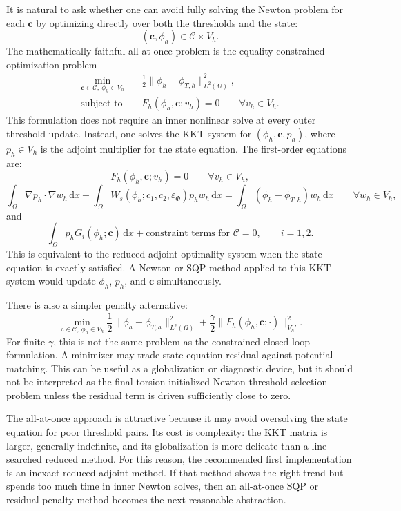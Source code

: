 \documentclass[11pt]{article}
\newcommand{\dd}{\,\mathrm d}
\newcommand{\OmegaD}{\Omega}
\newcommand{\W}{W}
\newcommand{\cvec}{\bm c}
\newcommand{\epsp}{\varepsilon_\Phi}
\begin{document}
It is natural to ask whether one can avoid fully solving the Newton problem
for each \(\cvec\) by optimizing directly over both the thresholds and the
state:
\[
  (\cvec,\phi_h)\in\mathcal C\times V_h.
\]
The mathematically faithful all-at-once problem is the equality-constrained
optimization problem
\[
  \boxed{
  \begin{aligned}
  \min_{\cvec\in\mathcal C,\ \phi_h\in V_h}
  \quad&
  \frac{1}{2}\|\phi_h-\phi_{T,h}\|_{L^2(\OmegaD)}^2,\\
  \text{subject to}\quad&
  F_h(\phi_h,\cvec;v_h)=0
  \qquad \forall v_h\in V_h.
  \end{aligned}
  }
\]
This formulation does not require an inner nonlinear solve at every outer
threshold update.  Instead, one solves the KKT system for
\((\phi_h,\cvec,p_h)\), where \(p_h\in V_h\) is the adjoint multiplier for the
state equation.  The first-order equations are:
\[
  F_h(\phi_h,\cvec;v_h)=0
  \qquad
  \forall v_h\in V_h,
\]
\[
  \int_{\OmegaD}\nabla p_h\cdot\nabla w_h\dd x
  -
  \int_{\OmegaD}
    \W_s(\phi_h;c_1,c_2,\epsp)p_h w_h
  \dd x
  =
  \int_{\OmegaD}(\phi_h-\phi_{T,h})w_h\dd x
  \qquad
  \forall w_h\in V_h,
\]
and
\[
  \int_{\OmegaD}p_hG_i(\phi_h;\cvec)\dd x
  +
  \text{constraint terms for }\mathcal C
  =
  0,
  \qquad i=1,2.
\]
This is equivalent to the reduced adjoint optimality system when the state
equation is exactly satisfied.  A Newton or SQP method applied to this KKT
system would update \(\phi_h\), \(p_h\), and \(\cvec\) simultaneously.

There is also a simpler penalty alternative:
\[
  \min_{\cvec\in\mathcal C,\ \phi_h\in V_h}
  \frac{1}{2}\|\phi_h-\phi_{T,h}\|_{L^2(\OmegaD)}^2
  +
  \frac{\gamma}{2}
  \|F_h(\phi_h,\cvec;\cdot)\|_{V_h'}^2.
\]
For finite \(\gamma\), this is not the same problem as the constrained
closed-loop formulation.  A minimizer may trade state-equation residual against
potential matching.  This can be useful as a globalization or diagnostic
device, but it should not be interpreted as the final torsion-initialized Newton threshold
selection problem unless the residual term is driven sufficiently close to
zero.

The all-at-once approach is attractive because it may avoid oversolving the
state equation for poor threshold pairs.  Its cost is complexity: the KKT
matrix is larger, generally indefinite, and its globalization is more delicate
than a line-searched reduced method.  For this reason, the recommended first
implementation is an inexact reduced adjoint method.  If that method shows the
right trend but spends too much time in inner Newton solves, then an all-at-once
SQP or residual-penalty method becomes the next reasonable abstraction.
\end{document}
